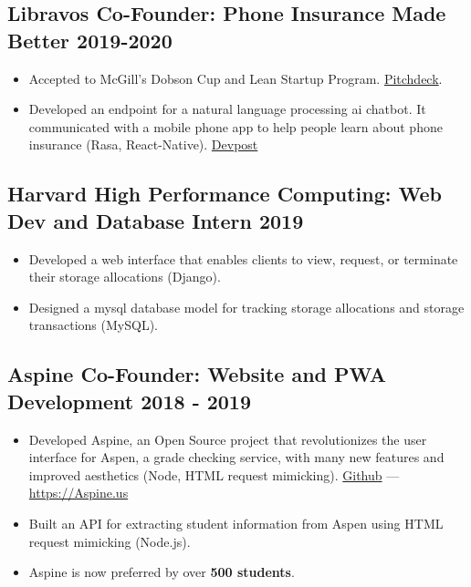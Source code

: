 \documentclass{article}
\begin{document}
\subsection{Libravos Co-Founder: Phone Insurance Made Better \hfill 2019-2020}
\begin{itemize}[leftmargin=0.5in]
  \setlength\itemsep{0.00em}
\item Accepted to McGill's Dobson Cup and Lean Startup Program. \href{https://docs.google.com/presentation/d/1mExXYPrHCWZ_4uRn0mu0f3_F_bhrw97eSgIJtMoN90k/edit?usp=sharing}{Pitchdeck}.
\item Developed an endpoint for a natural language processing ai chatbot. It communicated with a mobile phone app to help people learn about phone insurance (Rasa, React-Native). \href{https://devpost.com/software/libravos-mobile-app-with-chat-bot}{Devpost}
\end{itemize}

\subsection{Harvard High Performance Computing: Web Dev and Database Intern \hfill 2019}
\begin{itemize}[leftmargin=0.5in]
  \setlength\itemsep{0.00em}
  \item Developed a web interface that enables clients to view, request, or terminate their storage allocations (Django).
  \item Designed a mysql database model for tracking storage allocations and storage transactions (MySQL).
\end{itemize}

\subsection{Aspine Co-Founder: Website and PWA Development \hfill 2018 - 2019}
\begin{itemize}[leftmargin=0.5in]
  \setlength\itemsep{0.00em}
  \item Developed Aspine, an Open Source project that revolutionizes the user interface for Aspen, a grade checking service, with many new features and improved aesthetics (Node, HTML request mimicking). \href{https://github.com/Aspine/aspine}{Github} --- \href{https://aspine.us}{https://Aspine.us}
  \item Built an API for extracting student information from Aspen using HTML request mimicking (Node.js).
  \item Aspine is now preferred by over \textbf{500 students}.
\end{itemize}
\end{document}
